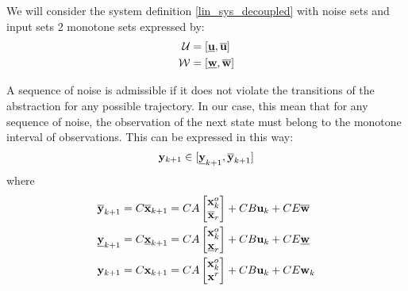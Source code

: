 We will consider the system definition \ref{lin_sys_decoupled} with noise sets and input sets 2 monotone sets expressed by:
\begin{equation}
\begin{aligned}
\mathcal{U} &= [\underline{ \mathbf{u}},\overline{ \mathbf{u}}]\\
\mathcal{W} &= [\underline{ \mathbf{w}},\overline{ \mathbf{w}}]\\
\end{aligned}
\end{equation}

A sequence of noise is admissible if it does not violate the transitions of the abstraction for any possible trajectory.
In our case, this mean that for any sequence of noise, the observation of the next state must belong to the monotone interval of observations.
This can be expressed in this way:
\begin{equation} \label{valid_transition}
 \mathbf{y}_{k+1} \in [\underline{ \mathbf{y}}_{k+1},\overline{ \mathbf{y}}_{k+1}]
\end{equation}
where 
\begin{align*}
\overline{ \mathbf{y}}_{k+1} &= C \overline{ \mathbf{x}}_{k+1} = 
C A 
\begin{bmatrix}
 \mathbf{x}^o_{k} \\
\overline{ \mathbf{x}}_r
\end{bmatrix}
+ C B  \mathbf{u}_{k} + C E \overline{ \mathbf{w}}
\\
\underline{ \mathbf{y}}_{k+1} &= C \underline{ \mathbf{x}}_{k+1} 
= C A 
\begin{bmatrix}
 \mathbf{x}^o_{k} \\
\underline{ \mathbf{x}}_r
\end{bmatrix}
+ C B  \mathbf{u}_{k} + C E \underline{ \mathbf{w}}
\\
 \mathbf{y}_{k+1} &= C  \mathbf{x}_{k+1}
= C A 
\begin{bmatrix}
 \mathbf{x}^o_{k} \\
 \mathbf{x}^r
\end{bmatrix}
+ C B  \mathbf{u}_{k} + C E  \mathbf{w}_{k}
\end{align*}

